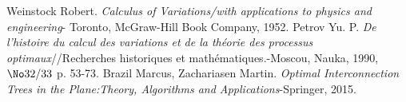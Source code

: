 \documentclass[10pt,a4paper]{article}%
\theoremstyle{theorem}
\theoremstyle{definition}
\begin{document}
	
	
		
		         
		         
		         
	        
	        
        
       
\begin{thebibliography}{9}
	 Weinstock Robert. \textit{Calculus of Variations/with applications to physics and engineering}- Toronto, McGraw-Hill Book Company, 1952.
	 Petrov Yu. P. \textit{De l'histoire du calcul des variations et de la théorie des processus optimaux}//Recherches historiques et mathématiques.-Moscou, Nauka, 1990, $\No 32/33$ p. 53-73.
	 Brazil Marcus, Zachariasen Martin. \textit{Optimal Interconnection Trees in the Plane:Theory, Algorithms and Applications}-Springer, 2015. 
\end{thebibliography}    
\end{document}
